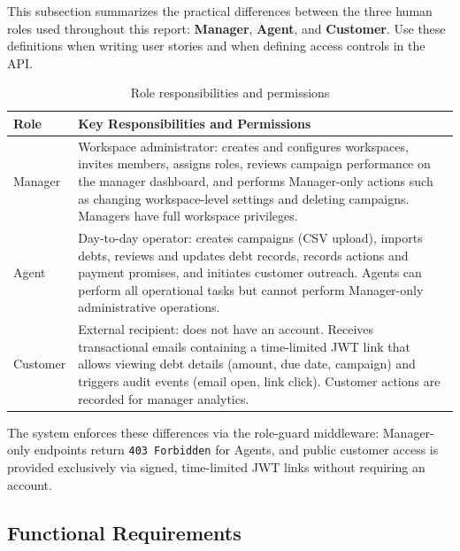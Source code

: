 \documentclass[12pt,a4paper]{report}
\begin{document}
This subsection summarizes the practical differences between the three human
roles used throughout this report: \textbf{Manager}, \textbf{Agent}, and
\textbf{Customer}. Use these definitions when writing user stories and when
defining access controls in the API.

\begin{table}[H]
  \centering
  \renewcommand{\arraystretch}{1.2}
  \begin{tabular}{|p{2.8cm}|p{8.2cm}|}
    \hline
    \textbf{Role} & \textbf{Key Responsibilities and Permissions} \\
    \hline
    Manager & Workspace administrator: creates and configures workspaces, invites members, assigns roles, reviews campaign performance on the manager dashboard, and performs Manager-only actions such as changing workspace-level settings and deleting campaigns. Managers have full workspace privileges. \\
    \hline
    Agent & Day-to-day operator: creates campaigns (CSV upload), imports debts, reviews and updates debt records, records actions and payment promises, and initiates customer outreach. Agents can perform all operational tasks but cannot perform Manager-only administrative operations. \\
    \hline
    Customer & External recipient: does not have an account. Receives transactional emails containing a time-limited JWT link that allows viewing debt details (amount, due date, campaign) and triggers audit events (email open, link click). Customer actions are recorded for manager analytics. \\
    \hline
  \end{tabular}
  \caption{Role responsibilities and permissions}
  \label{tab:roles}
\end{table}

The system enforces these differences via the role-guard middleware: Manager-only
endpoints return \texttt{403 Forbidden} for Agents, and public customer access is
provided exclusively via signed, time-limited JWT links without requiring an
account.


\subsection{Functional Requirements}
\end{document}
